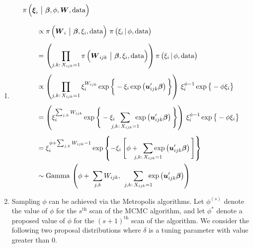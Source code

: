 \documentclass[11pt]{article}
\renewcommand{\vec}{\boldsymbol}
\newcommand{\barS}{\,|\,}
\newcommand{\barM}{~\big|~}
\begin{document}
\begin{enumerate}[label=Step \arabic*., leftmargin=13mm, itemsep=10mm]

\item 
\begin{align*} \MoveEqLeft
\pi\, \Big( \vec{\xi}_i \barM \vec{\beta}, \phi, \vec{W}, \text{data} \Big) \\[2ex]
&\propto \pi\,\Big( \vec{W}_i \barM \vec{\beta}, \xi_i, \text{data} \Big)~ \pi\, \big( \xi_i \barS \phi, \text{data} \big) \\[1ex]
&= \left( \prod_{j,k{:}\, X_{ijk}=1} \pi\,\Big( \vec{W}_{ijk} \barM \vec{\beta}, \xi_i, \text{data} \Big) \right) \pi\, \big( \xi_i \barS \phi, \text{data} \big) \\[1ex]
&\propto \left( \prod_{j,k{:}\, X_{ijk}=1} \xi_i^{W_{ijk}} \exp\bigg\{ -\xi_i \exp\left( \vec{u}_{ijk}^\prime \vec{\beta} \right) \bigg\} \right)\, \xi_i^{\phi - 1} \exp\big\{ -\phi \xi_i \big\} \\[1ex]
&= \left( \xi_i^{\sum_{j,k} W_{ijk}} \exp\Bigg\{ -\xi_i \hspace{2mm} \sum_{\mathclap{ j,k{:}\, X_{ijk}=1 }} \hspace{2mm} \exp\left( \vec{u}_{ijk}^\prime \vec{\beta} \right) \Bigg\} \right)\, \xi_i^{\phi - 1} \exp\big\{ -\phi \xi_i \big\} \\[1ex]
&= \xi_i^{ \phi + \sum_{j,k} W_{ijk} - 1 } \exp\left\{ -\xi_i\, \Bigg[ \phi + \hspace{2mm} \sum_{\mathclap{ j,k{:}\, X_{ijk}=1 }} \exp\left( \vec{u}_{ijk}^\prime \vec{\beta} \right) \Bigg] \right\} \\
& \sim \text{Gamma}\,\left(\phi + \hspace{1mm} \sum_{j,k} W_{ijk}, \hspace{6mm} \sum_{\mathclap{ j,k{:}\, X_{ijk}=1 }}\hspace{2mm} \exp\left( \vec{u}_{ijk}^\prime \vec{\beta} \right) \right)
\end{align*}






\item Sampling $\phi$ can be achieved via the Metropolis algorithms.  Let $\phi^{(s)}$ denote the value of $\phi$ for the $s^{\text{th}}$ scan of the MCMC algorithm, and let $\phi^*$ denote a proposed value of $\phi$ for the $(s+1)^{\text{th}}$ scan of the algorithm.  We consider the following two proposal distributions where $\delta$ is a tuning parameter with value greater than 0. \vspace{2mm}


\end{enumerate}
\end{document}
